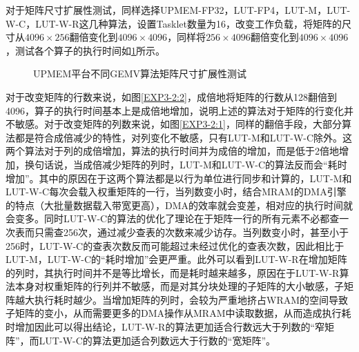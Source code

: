 对于矩阵尺寸扩展性测试，同样选择UPMEM-FP32，LUT-FP4，LUT-M，LUT-W-C，LUT-W-R这几种算法，设置Tasklet数量为16，改变工作负载，将矩阵的尺寸从$4096\times 256$翻倍变化到$4096\times 4096$，同样将$256\times 4096$翻倍变化到$4096\times 4096$，测试各个算子的执行时间如\ref{EXP3-2}所示。

\begin{figure}[htbp!]
	\centering
	\label{EXP3-2}
	\caption{UPMEM平台不同GEMV算法矩阵尺寸扩展性测试}
\end{figure}

对于改变矩阵的行数来说，如图\ref{EXP3-2:2}，成倍地将矩阵的行数从128翻倍到4096，算子的执行时间基本上是成倍地增加，说明上述的算法对于矩阵的行变化并不敏感。对于改变矩阵的列数来说，如图\ref{EXP3-2:1}，同样的翻倍手段，大部分算法都是符合成倍减少的特性，对列变化不敏感，只有LUT-M和LUT-W-C除外。这两个算法对于列的成倍增加，算法的执行时间并为成倍的增加，而是低于2倍地增加，换句话说，当成倍减少矩阵的列时，LUT-M和LUT-W-C的算法反而会“耗时增加”。其中的原因在于这两个算法都是以行为单位进行同步和计算的，LUT-M和LUT-W-C每次会载入权重矩阵的一行，当列数变小时，结合MRAM的DMA引擎的特点（大批量数据载入带宽更高），DMA的效率就会变差，相对应的执行时间就会变多。同时LUT-W-C的算法的优化了理论在于矩阵一行的所有元素不必都查一次表而只需查256次，通过减少查表的次数来减少访存。当列数变小时，甚至小于256时，LUT-W-C的查表次数反而可能超过未经过优化的查表次数，因此相比于LUT-M，LUT-W-C的“耗时增加”会更严重。此外可以看到LUT-W-R在增加矩阵的列时，其执行时间并不是等比增长，而是耗时越来越多，原因在于LUT-W-R算法本身对权重矩阵的行列并不敏感，而是对其分块处理的子矩阵的大小敏感，子矩阵越大执行耗时越少。当增加矩阵的列时，会较为严重地挤占WRAM的空间导致子矩阵的变小，从而需要更多的DMA操作从MRAM中读取数据，从而造成执行耗时增加因此可以得出结论，LUT-W-R的算法更加适合行数远大于列数的“窄矩阵”，而LUT-W-C的算法更加适合列数远大于行数的“宽矩阵”。

